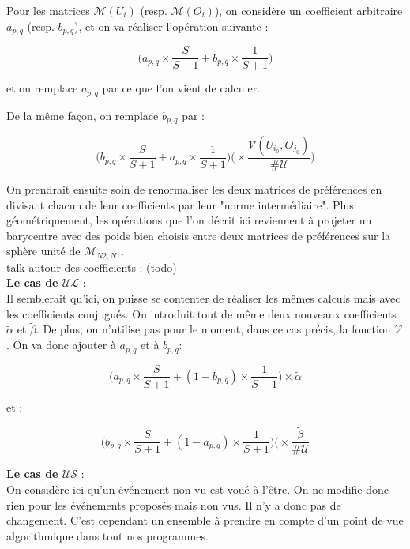 \documentclass[11pt, oneside]{article}
\begin{document}
Pour les matrices $\mathcal{M} (U_i)$ (resp. $\mathcal{M} (O_i)$), on considère un coefficient arbitraire $a_{p,q}$ (resp. $b_{p,q}$), et on va réaliser l'opération suivante :
\begin{center}
\[
 \big( a_{p,q} \times \frac{S}{S+1} + b_{p,q}\times \frac{1}{S+1} \big) 
\]
\end{center}
et on remplace $a_{p,q}$ par ce que l'on vient de calculer.

De la même façon, on remplace $b_{p,q}$ par :
\begin{center}
\[
 \big( b_{p,q} \times \frac{S}{S+1} + a_{p,q}\times \frac{1}{S+1}) \big( \times \frac{\mathcal{V}(U_{i_0},O_{j_{0}})}{\#\mathcal{U}})
\]
\end{center}

On prendrait ensuite soin de renormaliser les deux matrices de préférences en divisant chacun de leur coefficients par leur "norme intermédiaire". Plus géométriquement, les opérations que l'on décrit ici reviennent à projeter un barycentre avec des poids bien choisis entre deux matrices de préférences sur la sphère unité de $ \mathcal{M}_{N2,N1} $. \\

talk autour des coefficients : (todo) \\

\textbf{Le cas de $\mathcal{UL}$} : \\

Il semblerait qu'ici, on puisse se contenter de réaliser les mêmes calculs mais avec les coefficients conjugués. On introduit tout de même deux nouveaux coefficients $\tilde{\alpha}$ et $\tilde{\beta}$. De plus, on n'utilise pas pour le moment, dans ce cas précis, la fonction $\mathcal{V}$. On va donc ajouter à $a_{p,q}$ et à $b_{p,q}$:
\begin{center}
\[
 \big( a_{p,q} \times \frac{S}{S+1} + (1 - b_{p,q})\times \frac{1}{S+1} \big) \times\tilde{\alpha}
\]
\end{center}
et :
\begin{center}
\[
 \big( b_{p,q} \times \frac{S}{S+1} + (1 - a_{p,q})\times \frac{1}{S+1}) \big( \times \frac{\mathcal{\tilde{\beta}}}{\#\mathcal{U}}
\]
\end{center}

\textbf{Le cas de $\mathcal{US}$} : \\

On considère ici qu'un événement non vu est voué à l'être. On ne modifie donc rien pour les événements proposés mais non vus. Il n'y a donc pas de changement. C'est cependant un ensemble à prendre en compte d'un point de vue algorithmique dans tout nos programmes.
\end{document}
